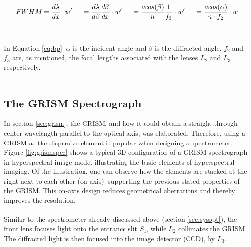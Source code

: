 \begin{equation}
    FWHM = \frac{d\lambda}{dx} \cdot w'\hspace{0.5cm}
    = \frac{d\lambda}{d\beta} \frac{d\beta}{dx}\cdot w' \hspace{0.5cm}
    = \frac{a cos(\beta)}{n} \frac{1}{f_3}\cdot w' \hspace{0.5cm}
    = \frac{a cos(\alpha)}{n\cdot f_2}\cdot w
    \label{eq:bp}
\end{equation}
\\\\
\noindent
In Equation \ref{eq:bp}, $\alpha$ is the incident angle and $\beta$ is the diffracted angle. $f_2$ and $f_3$ are, as mentioned, the focal lengths associated with the lenses $L_2$ and $L_3$ respectively.
\\\\
\subsection{The GRISM Spectrograph}
In section \ref{sec:grism}, the GRISM, and how it could obtain a straight through center wavelength parallel to the optical axis, was elaborated. Therefore, using a GRISM as the dispersive element is popular when designing a spectrometer. Figure \ref{fig:grismspec} shows a typical 3D configuration of a GRISM spectrograph in hyperspectral image mode, illustrating the basic elements of hyperspectral imaging. Of the illustration, one can observe how the elements are stacked at the right next to each other (on axis), supporting the previous stated properties of the GRISM. This on-axis design reduces geometrical aberrations and thereby improves the resolution. 
\\\\
Similar to the spectrometer already discussed above (section \ref{sec:sysopt}), the front lens focuses light onto the entrance slit $S_1$, while $L_2$ collimates the GRISM. The diffracted light is then focused into the image detector (CCD), by $L_3$. 

